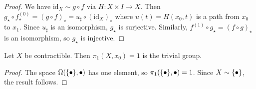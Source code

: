 \begin{proof}
	We have \( \mathrm{id}_X \sim g \circ f \) via \( H \colon X \times I \to X \).
	Then \( g_\star \circ f^{(0)}_\star = (g \circ f)_\star = u_\sharp \circ (\mathrm{id}_X)_\star \) where \( u(t) = H(x_0,t) \) is a path from \( x_0 \) to \( x_1 \).
	Since \( u_\sharp \) is an isomorphism, \( g_\star \) is surjective.
	Similarly, \( f^{(1)} \circ g_\star = (f \circ g)_\star \) is an isomorphism, so \( g_\star \) is injective.
\end{proof}
\begin{corollary}
	Let \( X \) be contractible.
	Then \( \pi_1(X,x_0) = 1 \) is the trivial group.
\end{corollary}
\begin{proof}
	The space \( \Omega(\qty{\bullet},\bullet) \) has one element, so \( \pi_1(\qty{\bullet},\bullet) = 1 \).
	Since \( X \sim \qty{\bullet} \), the result follows.
\end{proof}
